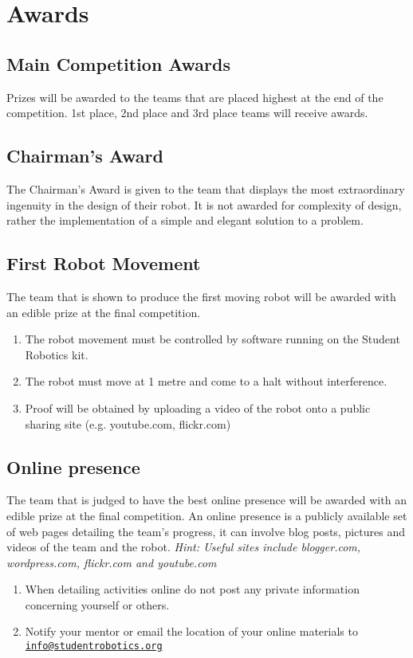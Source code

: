 \section {Awards}
\label{sec:Awards}

\subsection{Main Competition Awards}
Prizes will be awarded to the teams that are placed highest at the end of the competition. 1st place, 2nd place and 3rd place teams will receive awards.

\subsection{Chairman's Award}
The Chairman's Award is given to the team that displays the most extraordinary ingenuity in the design of their robot. It is not awarded for complexity of design, rather the implementation of a simple and elegant solution to a problem.

\subsection{First Robot Movement}
The team that is shown to produce the first moving robot will be awarded with an edible prize at the final competition.
\begin{enumerate}
\item The robot movement must be controlled by software running on the Student Robotics kit.
\item The robot must move at 1 metre and come to a halt without interference.
\item Proof will be obtained by uploading a video of the robot onto a public sharing site (e.g. youtube.com, flickr.com)
\end{enumerate}


\subsection{Online presence} 
The team that is judged to have the best online presence will be awarded with an edible prize at the final competition.  An online presence is a publicly available set of web pages detailing the team's progress, it can involve blog posts, pictures and videos of the team and the robot.  \emph{Hint: Useful sites include blogger.com, wordpress.com, flickr.com and youtube.com}
\begin{enumerate}
\item When detailing activities online do not post any private information concerning yourself or others.
\item Notify your mentor or email the location of your online materials to \linebreak\href{mailto:info@studentrobotics.org}{\nolinkurl{info@studentrobotics.org}}
\end{enumerate}
